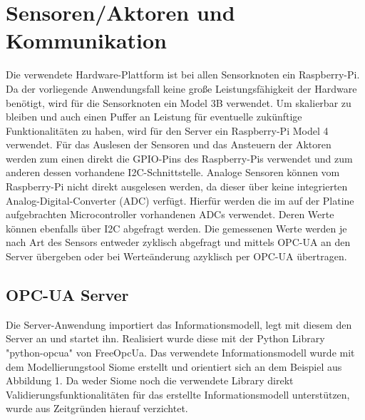 \section{Sensoren/Aktoren und Kommunikation}\label{ch:sensoren_kommunikation}

\newline Die verwendete Hardware-Plattform ist bei allen Sensorknoten ein Raspberry-Pi. Da der vorliegende Anwendungsfall keine große Leistungsfähigkeit der Hardware benötigt, wird für die Sensorknoten ein Model 3B verwendet. Um skalierbar zu bleiben und auch einen Puffer an Leistung für eventuelle zukünftige Funktionalitäten zu haben, wird für den Server ein Raspberry-Pi Model 4 verwendet.
\newline Für das Auslesen der Sensoren und das Ansteuern der Aktoren werden zum einen direkt die GPIO-Pins des Raspberry-Pis verwendet und zum anderen dessen vorhandene I2C-Schnittstelle. Analoge Sensoren können vom Raspberry-Pi nicht direkt ausgelesen werden, da dieser über keine integrierten Analog-Digital-Converter (ADC) verfügt. Hierfür werden die im auf der Platine aufgebrachten Microcontroller vorhandenen ADCs verwendet. Deren Werte können ebenfalls über I2C abgefragt werden.
\newline Die gemessenen Werte werden je nach Art des Sensors entweder zyklisch abgefragt und mittels OPC-UA an den Server übergeben oder bei Werteänderung azyklisch per OPC-UA übertragen.

\subsection{OPC-UA Server}
Die Server-Anwendung importiert das Informationsmodell, legt mit diesem den Server an und startet ihn. Realisiert wurde diese mit der Python Library "python-opcua" von FreeOpcUa. Das verwendete Informationsmodell wurde mit dem Modellierungstool Siome erstellt und orientiert sich an dem Beispiel aus Abbildung 1. Da weder Siome noch die verwendete Library direkt Validierungsfunktionalitäten für das erstellte Informationsmodell unterstützen, wurde aus Zeitgründen hierauf verzichtet.

